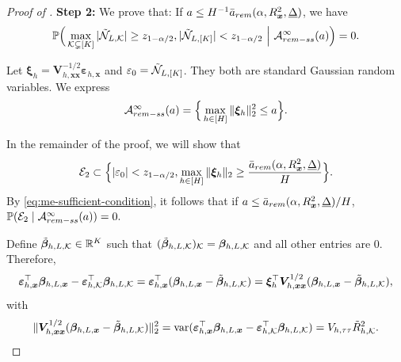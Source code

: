 \documentclass[10pt,a4paper]{amsart}
\newcommand{\Lin}{\textnormal{L}}
\newcommand{\Prob}{\mathbb{P}}
\newcommand{\bs}{\boldsymbol}
\newcommand{\mk}{\mathcal{K}}
\newcommand{\remss}{\textnormal{rem-ss}}
\newcommand{\rem}{\textnormal{rem}}
\newcommand{\var}{\operatorname{var}}
\begin{document}
\begin{proof}[Proof of ]
\noindent\textbf{Step 2:} We prove that: If $a \leq  H^{-1}\bar{a}_{\rem}(\alpha, R^2_{\bs{x}}, \underline{\Delta})$, we have
\[
\Prob\Big(\max_{\mk \subsetneq [K]} |\tilde{\mathcal{N}}_{\Lin,\mk}| \geq z_{1-\alpha/2}, |\tilde{\mathcal{N}}_{\Lin,[K]}| < z_{1-\alpha/2}~\Big|~\mathcal{A}_{\remss}^{\infty}(a)\Big) = 0.
\]

Let $\bs{\xi}_{ h } = \bs{V}_{ h, \bs{x}\bs{x}}^{-1/2}\bs{\varepsilon}_{ h, \bs{x}} $ and  $\varepsilon_0 = \tilde{\mathcal{N}}_{\Lin,[K]} $. They both are standard Gaussian 
random variables. We express $$\mathcal{A}_{\remss}^{\infty}(a) = \Big\{\max_{h\in [H]} \|\bs{\xi}_{ h }\|_2^2 \leq a\Big\}.$$ 

In the remainder of the proof, we will show that
\begin{align}
\label{eq:me-sufficient-condition}
    \mathcal{E}_2  \subset \Big\{|\varepsilon_0| < z_{1-\alpha/2}, \max_{h\in [H]} \|\bs{\xi}_{ h }\|_2 \geq  \frac{\bar{a}_{\rem}(\alpha, R^2_{\bs{x}}, \underline{\Delta})}{H}\Big\}.
\end{align}
By \eqref{eq:me-sufficient-condition}, it follows that if $a \leq \bar{a}_{\rem}(\alpha, R^2_{\bs{x}}, \underline{\Delta})/H$, 
$\Prob(\mathcal{E}_2\mid\mathcal{A}_{\remss}^{\infty}(a)) = 0.$


 Define $\tilde{\bs{\beta}}_{h,\Lin,\mk}\in \mathbb{R}^K$ such that $(\tilde{\bs{\beta}}_{h,\Lin,\mk})_{\mk} = \bs{\beta}_{h,\Lin,\mk}$ and all other entries are $0$.
Therefore, 
\[
\bs{\varepsilon}_{ h, \bs{x}}^\top \bs{\beta}_{h, \Lin , \bs{x}}-\bs{\varepsilon}_{ h, \mk}^\top\bs{\beta}_{ h, \Lin, \mk} = \bs{\varepsilon}_{ h, \bs{x}}^\top (\bs{\beta}_{h, \Lin , \bs{x}}-\tilde{\bs{\beta}}_{h,\Lin,\mk}) = \bs{\xi}_{ h }^\top \bs{V}_{h,\bs{x}\bs{x}}^{1/2} (\bs{\beta}_{h, \Lin , \bs{x}}-\tilde{\bs{\beta}}_{h,\Lin,\mk}),
\]
with
\begin{align*}
  \| \bs{V}_{h,\bs{x}\bs{x}}^{1/2} (\bs{\beta}_{h, \Lin , \bs{x}}-\tilde{\bs{\beta}}_{h,\Lin,\mk})\|_2^2 = \var(\bs{\varepsilon}_{ h, \bs{x}}^\top \bs{\beta}_{h, \Lin , \bs{x}}-\bs{\varepsilon}_{ h, \mk}^\top\bs{\beta}_{ h, \Lin, \mk} ) = V_{ h,\tau\tau} \tilde{R}^2_{h,\mk}.
\end{align*}


\end{proof}
\end{document}
